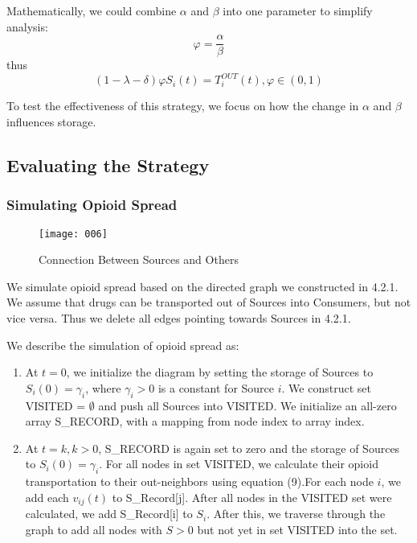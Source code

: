 Mathematically, we could combine $\alpha$ and $\beta$ into one parameter to simplify analysis:
\begin{equation}
\varphi = \frac{\alpha}{\beta}
\end{equation}
thus
\begin{equation}
 (1 - \lambda - \delta) \varphi S_i(t) = T_i^{OUT}(t), \varphi \in (0,1)
\end{equation}




To test the effectiveness of this strategy, we focus on how the change in $\alpha$ and $\beta$ influences storage.

\subsection{Evaluating the Strategy}
\subsubsection{Simulating Opioid Spread}

\begin{wrapfigure}[13]{r}{0.25\linewidth} %
	\begin{center}
		\texttt{[image: 006]}
	\end{center}
	\caption{Connection Between Sources and Others}
\end{wrapfigure}

We simulate opioid spread based on the directed graph we constructed in 4.2.1. We assume that drugs can be transported out of Sources into Consumers, but not vice versa. Thus we delete all edges pointing towards Sources in 4.2.1. 

We describe the simulation of opioid spread as:

\begin{enumerate}[(1)]
	\item At $t=0$, we initialize the diagram by setting the storage of Sources to $S_i(0)=\gamma_i$, where $\gamma_i>0$ is a constant for Source $i$. We construct set VISITED = $\emptyset$ and push all Sources into VISITED. We initialize an all-zero array S\_RECORD, with a mapping from node index to array index.
	
	\item At $t=k, k>0$, S\_RECORD is again set to zero and the storage of Sources to $S_i(0)=\gamma_i$. For all nodes in set VISITED, we calculate their opioid transportation to their out-neighbors using equation (9).For each node $i$, we add each $v_{ij}(t)$ to S\_Record[j]. After all nodes in the VISITED set were calculated, we add S\_Record[i] to $S_i$. After this, we traverse through the graph to add all nodes with $S>0$ but not yet in set VISITED into the set. 

\end{enumerate}

